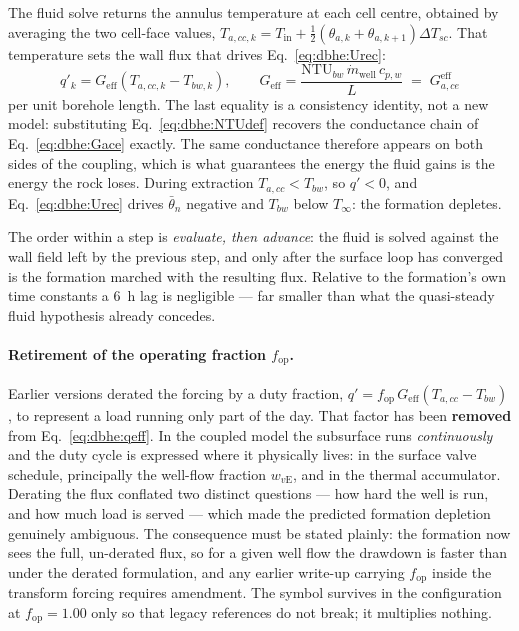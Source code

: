 The fluid solve returns the annulus temperature at each cell centre, obtained by
averaging the two cell-face values,
$T_{a,cc,k}=T_{\mathrm{in}}+\tfrac12(\theta_{a,k}+\theta_{a,k+1})\Delta T_{sc}$.
That temperature sets the wall flux that drives Eq.~\eqref{eq:dbhe:Urec}:
\begin{equation}
\boxed{\; q'_k=G_{\mathrm{eff}}\left(T_{a,cc,k}-T_{bw,k}\right), \qquad
G_{\mathrm{eff}}=\frac{\mathrm{NTU}_{bw}\,\dot m_{\mathrm{well}}\,c_{p,w}}{L}
\;=\;G_{a,ce}^{\mathrm{eff}} \; }
\label{eq:dbhe:qeff}
\end{equation}
per unit borehole length. The last equality is a consistency identity, not a new
model: substituting Eq.~\eqref{eq:dbhe:NTUdef} recovers the conductance chain
of Eq.~\eqref{eq:dbhe:Gace} exactly. The same conductance therefore appears on
both sides of the coupling, which is what guarantees the energy the fluid gains
is the energy the rock loses. During extraction $T_{a,cc}<T_{bw}$, so $q'<0$,
and Eq.~\eqref{eq:dbhe:Urec} drives $\bar\theta_n$ negative and $T_{bw}$ below
$T_\infty$: the formation depletes.

The order within a step is \emph{evaluate, then advance}: the fluid is solved
against the wall field left by the previous step, and only after the surface
loop has converged is the formation marched with the resulting flux. Relative to
the formation's own time constants a \SI{6}{\hour} lag is negligible --- far
smaller than what the quasi-steady fluid hypothesis already concedes.

\paragraph{Retirement of the operating fraction $f_{\mathrm{op}}$.}
Earlier versions derated the forcing by a duty fraction,
$q'=f_{\mathrm{op}}\,G_{\mathrm{eff}}(T_{a,cc}-T_{bw})$, to represent a load
running only part of the day. That factor has been \textbf{removed} from
Eq.~\eqref{eq:dbhe:qeff}. In the coupled model the subsurface runs
\emph{continuously} and the duty cycle is expressed where it physically lives:
in the surface valve schedule, principally the well-flow fraction
$w_{v\mathrm{E}}$, and in the thermal accumulator. Derating the flux conflated
two distinct questions --- how hard the well is run, and how much load is served
--- which made the predicted formation depletion genuinely ambiguous. The
consequence must be stated plainly: the formation now sees the full, un-derated
flux, so for a given well flow the drawdown is faster than under the derated
formulation, and any earlier write-up carrying $f_{\mathrm{op}}$ inside the
transform forcing requires amendment. The symbol survives in the configuration
at $f_{\mathrm{op}}=1.00$ only so that legacy references do not break; it
multiplies nothing.

